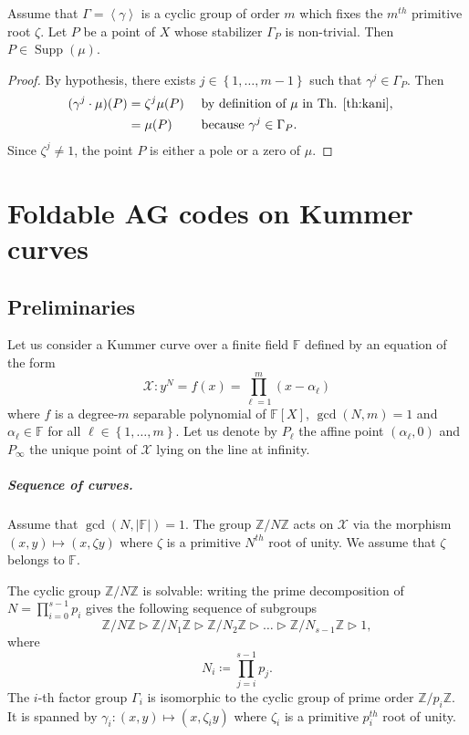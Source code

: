 \documentclass[10pt,a4paper]{article}
\newcommand\F{\mathbb{F}}
\newcommand\Z{\mathbb{Z}}
\newcommand\gen[1]{\left\langle #1 \right\rangle}
\DeclareMathOperator{\Supp}{Supp}
\newcommand{\set}[1]{\left\{#1\right\}}
\newcommand{\size}[1]{\left|#1\right|}
\newcommand{\Range}[2]{\set{#1,\dots,#2}}
\newcommand\calX{\mathcal{X}}
\newcommand\mydef{\coloneqq}
\theoremstyle{plain}
\theoremstyle{plain}
\theoremstyle{definition}
\theoremstyle{remark}
\theoremstyle{plain}
\begin{document}
\begin{lemma}\label{lem:pts-ram}
	Assume that $\Gamma=\gen{\gamma}$ is a cyclic group of order $m$ which fixes the $m^{th}$ primitive root $\zeta$. Let $P$ be a point of $X$ whose stabilizer $\Gamma_P$ is non-trivial. Then ${P \in \Supp(\mu)}$.
\end{lemma}

\begin{proof}
	By hypothesis, there exists $j \in \Range{1}{m-1}$ such that $\gamma^j\in\Gamma_P$. Then
	\begin{align*}
		(\gamma^j\cdot \mu)(P)&=\zeta^j \mu(P) && \text{ by definition of } \mu\text{ in Th. \ref{th:kani},}&\\
		&= \mu(P) & &\text{ because }\gamma^j \in \Gamma_P.&
	\end{align*}
	Since $\zeta^j \neq 1$, the point $P$ is either a pole or a zero of $\mu$.
\end{proof}

\section{Foldable AG codes on Kummer curves}\label{subsec:Kummer}

\subsection{Preliminaries}

Let us consider a Kummer curve over a finite field $\F$ defined by an equation of the form 
\begin{equation}\label{eq:def-Kummer}\calX: y^N=f(x)=\prod_{\ell=1}^m (x-\alpha_\ell)\end{equation}
where $f$ is a degree-$m$ separable polynomial of $\F[X]$, $\gcd(N,m)=1$ and $\alpha_\ell \in \F$ for all $\ell \in \Range{1}{m}$. Let us denote by $P_\ell$ the affine point $(\alpha_\ell,0)$ and $P_\infty$ the unique point of $\calX$ lying on the line at infinity.


\subparagraph*{Sequence of curves.} Assume that $\gcd(N,\size{\F})=1$. 
The group $\Z/N\Z$ acts on $\calX$ via the morphism $(x,y) \mapsto (x,\zeta y)$ where $\zeta$ is a primitive $N^{th}$ root of unity. We assume that $\zeta$ belongs to $\F$.

The cyclic group $\Z/N\Z$ is solvable: writing the prime decomposition of $N=\prod_{i=0}^{s-1} p_i$ gives the following sequence of subgroups
\begin{equation}\label{eq:comp-series-kummer}
	\Z/N\Z \vartriangleright \Z/N_1\Z \vartriangleright \Z/N_2\Z \vartriangleright \dots \vartriangleright \Z/N_{s-1}\Z \vartriangleright 1, 
\end{equation}
where 
\begin{equation}\label{eq:def:N_i}
	N_i\mydef\prod_{j=i}^{s-1} p_j.
\end{equation}
The $i$-th factor group $\Gamma_i$ is isomorphic to the cyclic group of prime order $\Z/p_i \Z$. It is spanned by $\gamma_i:(x,y) \mapsto (x,\zeta_iy)$ where $\zeta_i$ is a primitive $p_i^{th}$ root of unity.
\end{document}
